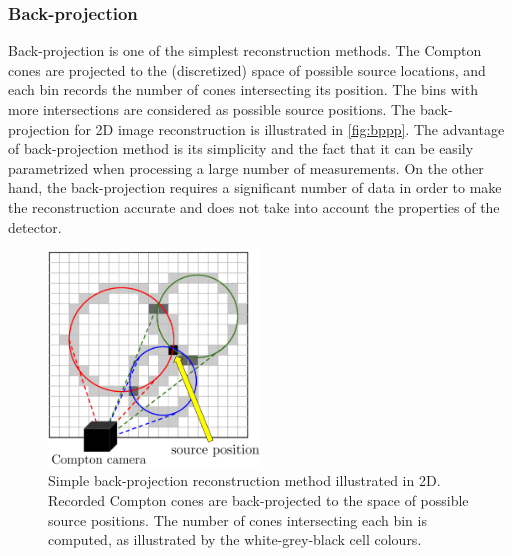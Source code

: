 \subsubsection{Back-projection}
Back-projection is one of the simplest reconstruction methods. 
The Compton cones are projected to the (discretized) space of possible source locations, and each bin records the number of cones intersecting its position. 
The bins with more intersections are considered as possible source positions.
The back-projection for 2D image reconstruction is illustrated in  \autoref{fig:bppp}.
The advantage of back-projection method is its simplicity and the fact that it can be easily parametrized when processing a large number of measurements.
On the other hand, the back-projection requires a significant number of data in order to make the reconstruction accurate and does not take into account the properties of the detector.
  \begin{figure}[!h]
    \centering
      \includegraphics[width=0.5\textwidth]{./fig/photos/back_proppp.eps}
    \caption{Simple back-projection reconstruction method illustrated in 2D. Recorded Compton cones are back-projected to the space of possible source positions. The number of cones intersecting each bin is computed, as illustrated by the white-grey-black cell colours.}
    \label{fig:bppp}
  \end{figure}

